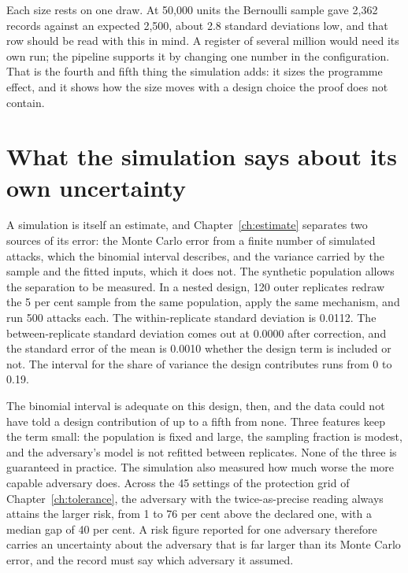 Each size rests on one draw. At 50,000 units the Bernoulli sample gave 2,362 records
against an expected 2,500, about 2.8 standard deviations low, and that row should be
read with this in mind.
A register of several million would need its own run; the pipeline supports it by
changing one number in the configuration. That is the fourth and fifth thing the
simulation adds: it sizes the programme effect, and it shows how the size moves with
a design choice the proof does not contain.

\section{What the simulation says about its own uncertainty}

A simulation is itself an estimate, and Chapter~\ref{ch:estimate} separates two
sources of its error: the Monte Carlo error from a finite number of simulated
attacks, which the binomial interval describes, and the variance carried by the
sample and the fitted inputs, which it does not. The synthetic population allows the
separation to be measured. In a nested design, 120 outer replicates redraw the 5 per
cent sample from the same population, apply the same mechanism, and run 500 attacks
each. The within-replicate standard deviation is 0.0112. The between-replicate
standard deviation comes out at 0.0000 after correction, and the standard error of
the mean is 0.0010 whether the design term is included or not. The interval for the
share of variance the design contributes runs from 0 to 0.19.

The binomial interval is adequate on this design, then, and the data could not have
told a design contribution of up to a fifth from none. Three features keep the term
small: the population is fixed and large, the sampling fraction is modest, and the
adversary's model is not refitted between replicates. None of the three is
guaranteed in practice. The simulation also measured how much worse the more capable
adversary does. Across the 45 settings of the protection grid of
Chapter~\ref{ch:tolerance}, the adversary with the twice-as-precise reading always
attains the larger risk, from 1 to 76 per cent above the declared one, with a median
gap of 40 per cent.
A risk figure reported for one adversary therefore carries an uncertainty about the
adversary that is far larger than its Monte Carlo error, and the record must say
which adversary it assumed.

